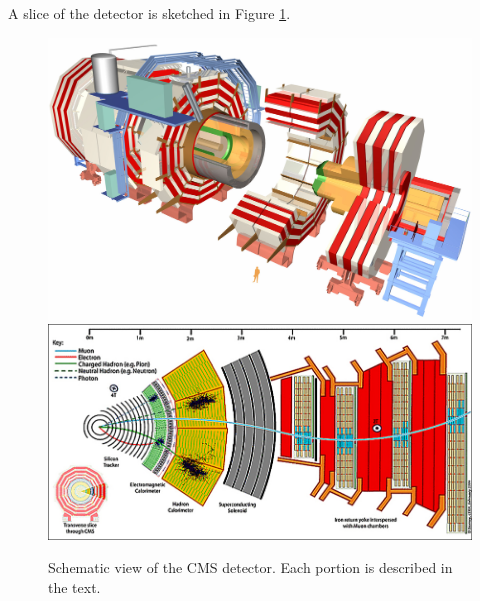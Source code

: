 A slice of the detector is sketched in Figure \ref{Fig:CMS:Slice}.
\begin{figure}[h!]
    \centering
        \includegraphics[width=\textwidth]{F3/CMSnc}
        \includegraphics[width=\textwidth]{F3/cms_slice}
        \caption{Schematic view of the CMS detector. Each portion is described in the text.}
        \label{Fig:CMS:Slice}
\end{figure}
